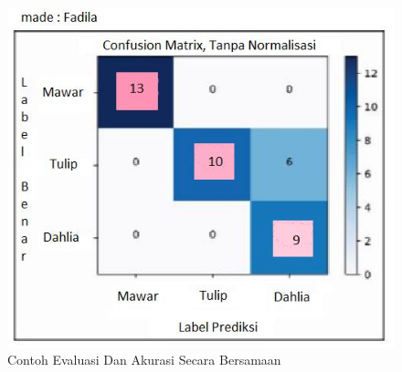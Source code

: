 \begin{enumerate}
\begin{itemize}
\begin{figure}[ht]
\centering
\includegraphics[scale=0.5]{figures/evacuray.jpg}
\caption{Contoh Evaluasi Dan Akurasi Secara Bersamaan }
\label{contoh}
\end{figure}

\end{itemize}


\end{enumerate}
